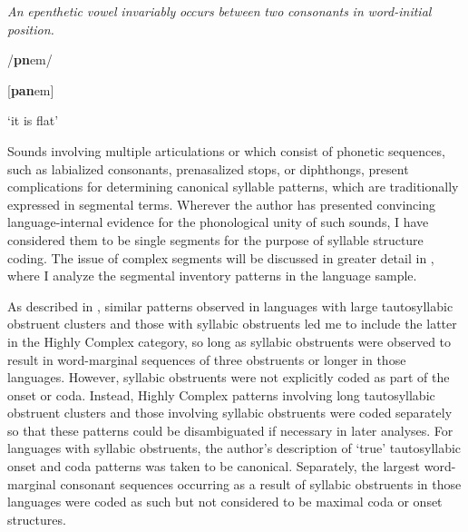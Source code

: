 \textit{An} \textit{epenthetic} \textit{vowel} \textit{invariably} \textit{occurs} \textit{between} \textit{two} \textit{consonants} \textit{in} \textit{word-initial} \textit{position.}

/\textbf{pn}em/

[\textbf{pan}em]

\glt ‘it is flat’

\citep[35-6]{Dol2007}

\z

  Sounds involving multiple articulations or which consist of phonetic sequences, such as labialized consonants, prenasalized stops, or diphthongs, present complications for determining canonical syllable patterns, which are traditionally expressed in segmental terms. Wherever the author has presented convincing language-internal evidence for the phonological unity of such sounds, I have considered them to be single segments for the purpose of syllable structure coding. The issue of complex segments will be discussed in greater detail in , where I analyze the segmental inventory patterns in the language sample.

  As described in , similar patterns observed in languages with large tautosyllabic obstruent clusters and those with syllabic obstruents led me to include the latter in the Highly Complex category, so long as syllabic obstruents were observed to result in word-marginal sequences of three obstruents or longer in those languages. However, syllabic obstruents were not explicitly coded as part of the onset or coda. Instead, Highly Complex patterns involving long tautosyllabic obstruent clusters and those involving syllabic obstruents were coded separately so that these patterns could be disambiguated if necessary in later analyses. For languages with syllabic obstruents, the author’s description of ‘true’ tautosyllabic onset and coda patterns was taken to be canonical. Separately, the largest word-marginal consonant sequences occurring as a result of syllabic obstruents in those languages were coded as such but not considered to be maximal coda or onset structures.

